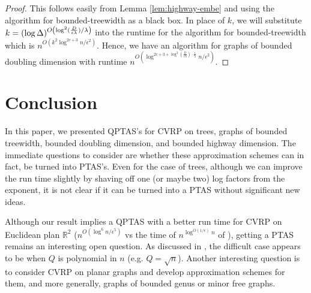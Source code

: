 \documentclass[twoside,leqno]{article}
\newcommand{\eps}{\epsilon}
\DeclarePairedDelimiter\autobracket{(}{)}
\newcommand{\br}[1]{\autobracket*{#1}}
\begin{document}
\begin{proof}
This follows easily from Lemma \ref{lem:highway-embe} and using the algorithm for bounded-treewidth as a black box. In place of $k$, we will substitute $k = (\log \Delta)^{O\br{\log^2(\frac{D}{\eps \lambda})/\lambda}}$ into the runtime for the algorithm for bounded-treewidth which is $n^{O(k^2 \log^{2c + 3}n/\eps^2)}$. Hence, we have an algorithm for graphs of bounded doubling dimension with runtime $n^{O( \log^{2c + 3 + \log^2(\frac{D}{\eps \lambda})\cdot \frac{1}{\lambda}}n/\eps^2)}$.
\end{proof}

\section{Conclusion}
In this paper, we presented QPTAS's for CVRP on trees, graphs of bounded treewidth, bounded doubling dimension, and bounded highway dimension. The immediate questions to consider are whether these approximation schemes can in fact, be turned into PTAS's. Even for the case of trees, although we can improve the run time slightly by shaving off one (or maybe two) log factors from the exponent, it is not clear if it can be turned into a PTAS without significant new ideas.

Although our result implies a QPTAS with a better run time
for CVRP on Euclidean plan $\mathbb{R}^2$ ($n^{O(\log^{6}n/\eps^{5})}$ vs the time of $n^{\log^{O(1/\epsilon)}n}$ of \cite{Das-Mathieu}), getting a PTAS remains an interesting open question.
As discussed in \cite{AdamaszekCL09}, the difficult case appears to be when $Q$ is polynomial in $n$ (e.g. $Q=\sqrt{n}$). Another interesting question is to consider CVRP on planar graphs and develop approximation schemes for them, and more generally, graphs of bounded genus or minor free graphs.


\end{document}
